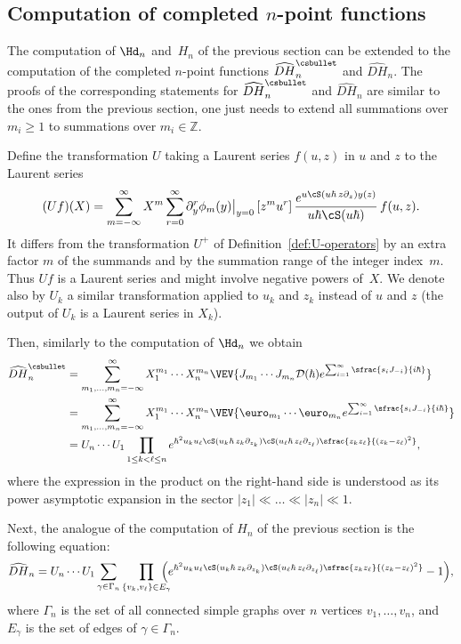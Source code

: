 \subsection{Computation of completed \texorpdfstring{$n$}{n}-point functions}

The computation of $\Hd_n$ and~$H_n$ of the previous section can be extended to the computation of the completed $n$-point functions $\widehat{DH}^\csbullet_n$ and $\widehat{DH}_n$. The proofs of the corresponding statements for $\widehat{DH}^\csbullet_n$ and $\widehat{DH}_n$ are similar to the ones from the previous section, one just needs to extend all summations over $m_i\ge1$ to summations over $m_i\in \mathbb{Z}$.

Define the transformation $U$ taking a Laurent series $f(u,z)$ in $u$ and $z$ to the Laurent series
\begin{equation*}
(U f)(X)=\sum_{m=-\infty}^\infty X^{m}\sum_{r=0}^\infty
\partial_y^{r}\phi_{m}(y)\big|_{y=0}\,[z^mu^r]\,
\frac{e^{ u\cS(u\hbar\,z\partial_z)y(z) }}{u\hbar\cS(u\hbar)}\,f(u,z).
\end{equation*}
It differs from the transformation $U^+$ of Definition~\ref{def:U-operators} by an extra factor $m$ of the summands and by the summation range of the integer index~$m$. Thus $U f$ is a Laurent series and might involve negative powers of~$X$. We denote also by $U_k$ a similar transformation applied to $u_k$ and $z_k$ instead of $u$ and $z$ (the output of $U_k$ is a Laurent series in $X_k$).

Then, similarly to the computation of $\Hd_n$ we obtain
\begin{align*}
\widehat{DH}^\csbullet_n
&=\sum_{m_1,\dots,m_n=-\infty}^\infty
X_1^{m_1}\cdots X_n^{m_n}
\VEV{J_{m_1}\cdots J_{m_n}\mathcal{D}(\hbar)e^{\sum_{i=1}^\infty \sfrac{s_i J_{-i}}{i\hbar} }}\\
&=\sum_{m_1,\dots,m_n=-\infty}^\infty
X_1^{m_1}\cdots X_n^{m_n}
\VEV{\euro_{m_1}\cdots \euro_{m_n}e^{\sum_{i=1}^\infty \sfrac{s_i J_{-i}}{i\hbar} }}\\
&=U_n\cdots U_1
\prod_{1\le k<\ell\le n}
e^{\hbar^2u_ku_\ell\cS(u_k\hbar\,z_k\partial_{z_k})\cS(u_\ell\hbar\,z_\ell \partial_{z_\ell})
\sfrac{z_k z_\ell}{(z_k-z_\ell)^2}},
\end{align*}
where the expression in the product on the right-hand side is understood as its power asymptotic expansion in the sector $|z_1|\ll\dots\ll|z_n|\ll1$.

Next, the analogue of the computation of $H_n$ of the previous section is the following equation:
\begin{equation}\label{eq:hatDH}
\widehat{DH}_n
=U_n\cdots U_1
\sum_{\gamma \in \Gamma_n}\prod_{\{v_k,v_\ell\}\in E_\gamma}\hspace*{-3mm}
\Bigl(e^{\hbar^2u_ku_\ell\cS(u_k\hbar\,z_k\partial_{z_k})\cS(u_\ell\hbar\,z_\ell \partial_{z_\ell})
\sfrac{z_k z_\ell}{(z_k-z_\ell)^2}}-1\Bigr),
\end{equation}
where $\Gamma_n$ is the set of all connected simple graphs over $n$ vertices $v_1,\ldots,v_n$, and $E_\gamma$ is the set of edges of $\gamma \in \Gamma_n$.

